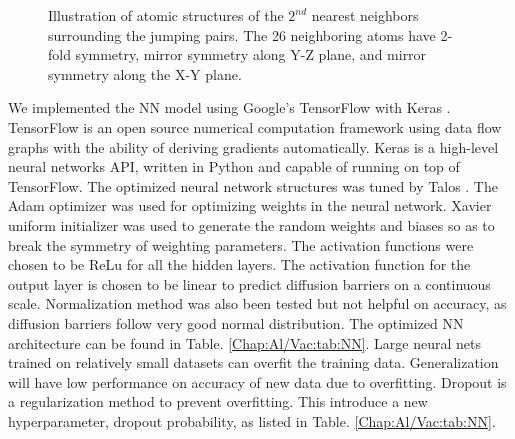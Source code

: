 \begingroup
\begin{figure}[!ht]
  \centering
\caption[Illustration of atomic structures of the $\text{2}^{nd}$ nearest neighbors surrounding the jumping pairs.]{Illustration of atomic structures of the $\text{2}^{nd}$ nearest neighbors surrounding the jumping pairs. The 26 neighboring atoms have 2-fold symmetry, mirror symmetry along Y-Z plane, and mirror symmetry along the X-Y plane.}
\label{Chap:Al/Vac:fig:2nn}
\end{figure}
\endgroup


We implemented the \ac{NN} model using Google's TensorFlow \cite{abadi2016tensorflow} with Keras \cite{chollet2015keras}. TensorFlow is an open source numerical computation framework using data flow graphs with the ability of deriving gradients automatically. Keras is a high-level neural networks API, written in Python and capable of running on top of TensorFlow. The optimized neural network structures was tuned by Talos \cite{Autonomio2019Talos}. The Adam optimizer \cite{kingma2014adam} was used for optimizing weights in the neural network. Xavier uniform initializer \cite{glorot2010understanding} was used to generate the random weights and biases so as to break the symmetry of weighting parameters. The activation functions were chosen to be \acf{ReLu} for all the hidden layers. The activation function for the output layer is chosen to be linear to predict diffusion barriers on a continuous scale. Normalization method was also been tested but not helpful on accuracy, as diffusion barriers follow very good normal distribution.  The optimized \ac{NN} architecture can be found in Table. \ref{Chap:Al/Vac:tab:NN}. Large neural nets trained on relatively small datasets can overfit the training data. Generalization will have low performance on accuracy of new data due to overfitting. Dropout is a regularization method to prevent overfitting. This introduce a new hyperparameter, dropout probability, as listed in Table. \ref{Chap:Al/Vac:tab:NN}.


